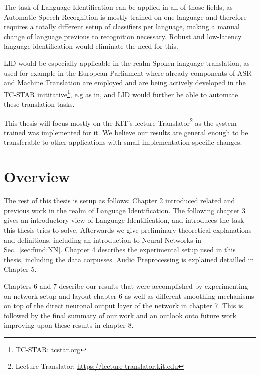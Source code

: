 The task of Language Identification can be applied in all of those fields, as Automatic Speech Recognition is mostly trained on one language and therefore requires a totally different setup of classifiers per language, making a manual change of language previous to recognition necessary. Robust and low-latency language identification would eliminate the need for this.

LID would be especially applicable in the realm Spoken language translation, as used for example in the European Parliament where already components of ASR and Machine Translation are employed and are being actively developed in the TC-STAR inititative\footnote{TC-STAR: \url{tcstar.org}}, e.g as in\cite{vilar2005statistical}, and LID would further be able to automate these translation tasks.

This thesis will focus mostly on the KIT's lecture Translator\footnote{Lecture Translator: \url{https://lecture-translator.kit.edu}}  as the system trained was implemented for it. We believe our results are general enough to be transferable to other applications with small implementation-specific changes.

\section{Overview}
\label{sec:Intro:Overview}

The rest of this thesis is setup as follows: Chapter 2 introduced related and previous work in the realm of Language Identification. The following chapter 3 gives an introductory view of Language Identification, and introduces the task this thesis tries to solve. Afterwards we give preliminary theoretical explanations and definitions, including an introduction to Neural Networks in Sec.~\ref{sec:fund:NN}. Chapter 4 describes the experimental setup used in this thesis, including the data corpusses. Audio Preprocessing is explained detailled in Chapter 5.

Chapters 6 and 7 describe our results that were accomplished by experimenting on network setup and layout chapter 6 as well as different smoothing mechanisms on top of the direct neuronal output layer of the network in chapter 7. This is followed by the final summary of our work and an outlook onto future work improving upon these results in chapter 8.